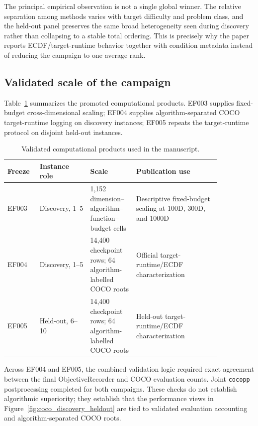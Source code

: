 The principal empirical observation is not a single global winner. The relative separation among methods varies with target difficulty and problem class, and the held-out panel preserves the same broad heterogeneity seen during discovery rather than collapsing to a stable total ordering. This is precisely why the paper reports ECDF/target-runtime behavior together with condition metadata instead of reducing the campaign to one average rank.

\subsection{Validated scale of the campaign}

Table~\ref{tab:campaign_scale} summarizes the promoted computational products. EF003 supplies fixed-budget cross-dimensional scaling; EF004 supplies algorithm-separated COCO target-runtime logging on discovery instances; EF005 repeats the target-runtime protocol on disjoint held-out instances.

\begin{table}[H]
\centering
\caption{Validated computational products used in the manuscript.}
\label{tab:campaign_scale}
\footnotesize
\begin{tabular}{p{0.11\linewidth}p{0.21\linewidth}p{0.18\linewidth}p{0.35\linewidth}}
\toprule
Freeze & Instance role & Scale & Publication use \\
\midrule
EF003 & Discovery, 1--5 & 1,152 dimension--algorithm--function--budget cells & Descriptive fixed-budget scaling at 100D, 300D, and 1000D \\
EF004 & Discovery, 1--5 & 14,400 checkpoint rows; 64 algorithm-labelled COCO roots & Official target-runtime/ECDF characterization \\
EF005 & Held-out, 6--10 & 14,400 checkpoint rows; 64 algorithm-labelled COCO roots & Held-out target-runtime/ECDF characterization \\
\bottomrule
\end{tabular}
\end{table}

Across EF004 and EF005, the combined validation logic required exact agreement between the final ObjectiveRecorder and COCO evaluation counts. Joint \texttt{cocopp} postprocessing completed for both campaigns. These checks do not establish algorithmic superiority; they establish that the performance views in Figure~\ref{fig:coco_discovery_heldout} are tied to validated evaluation accounting and algorithm-separated COCO roots.

